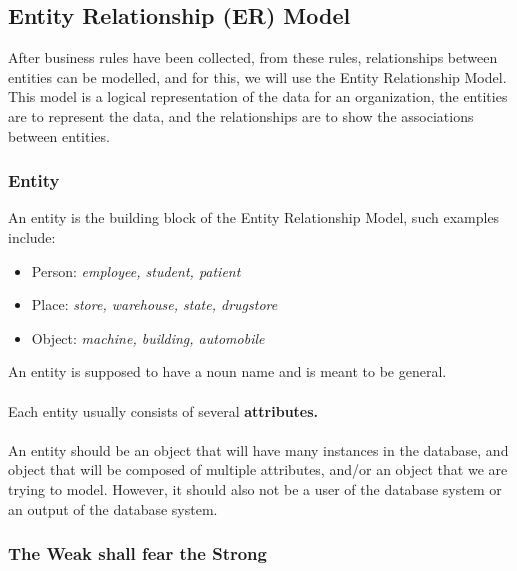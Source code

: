 \documentclass[12pt]{article}
\begin{document}
\subsection{Entity Relationship (ER) Model}

After business rules have been collected, from these rules, relationships between entities can be modelled, and for this, we will use the Entity Relationship Model. This model is a logical representation of the data for an organization, the entities are to represent the data, and the relationships are to show the associations between entities.

\subsubsection{Entity}

An entity is the building block of the Entity Relationship Model, such examples include:
\begin{itemize}
	\item{Person: \textit{employee, student, patient}}
	\item{Place: \textit{store, warehouse, state, drugstore}}
	\item{Object: \textit{machine, building, automobile}}
\end{itemize}

An entity is supposed to have a noun name and is meant to be general.\\
\\
Each entity usually consists of several \textbf{attributes.}\\
\\
An entity should be an object that will have many instances in the database, and object that will be composed of multiple attributes, and/or an object that we are trying to model. However, it should also not be a user of the database system or an output of the database system.

\subsubsection{The Weak shall fear the Strong}
\end{document}
